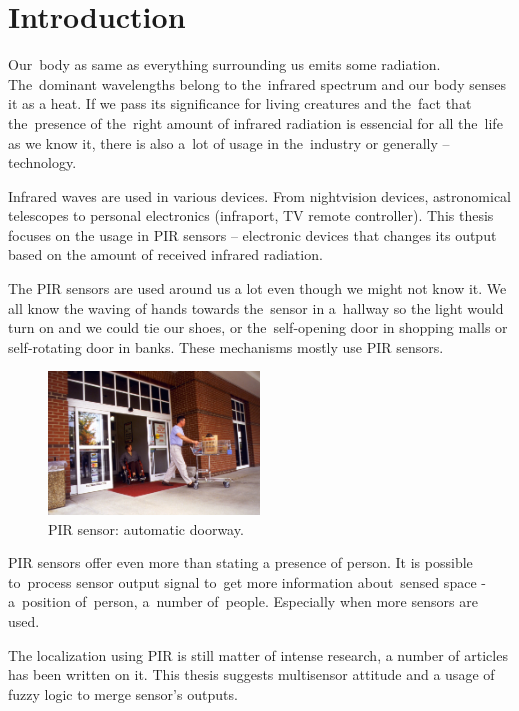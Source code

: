 

\chapter{Introduction}
\label{chapter:introduction}


Our~body as same as everything surrounding us emits some radiation. The~dominant wavelengths
belong to the~infrared spectrum and our body senses it as a heat. If we pass its significance
for living creatures and the~fact that the~presence of the~right amount of infrared radiation
is essencial for all the~life as we know it, there is also a~lot of usage in the~industry or
generally -- technology.

Infrared waves are used in various devices. From nightvision devices, astronomical telescopes to personal
electronics (infraport, TV remote controller). This thesis focuses on the usage in PIR
sensors -- electronic devices that changes its output based on the amount of received infrared
radiation.

The PIR sensors are used around us a lot even though we might not know it. We all know the waving
of hands towards the~sensor in a~hallway so the light would turn on and we could tie our shoes,
or the~self-opening door in shopping malls or self-rotating door in banks. These mechanisms mostly
use PIR sensors.

\begin{figure}[h!]
  \begin{center}
    \includegraphics[width=0.5\textwidth]{img/automaticdoorway.jpg}
    \caption{PIR sensor: automatic doorway. \cite{automaticdoorway} \label{fig:automaticdoorway}}
  \end{center}
\end{figure}

PIR sensors offer even more than stating a presence of person. It is possible to~process sensor
output signal to~get more information about~sensed space - a~position of~person, a~number of~people.
Especially when more sensors are used.

The localization using PIR is still matter of intense research, a number of articles has been
written on it. This thesis suggests multisensor attitude and a usage of fuzzy logic to merge
sensor's outputs.






